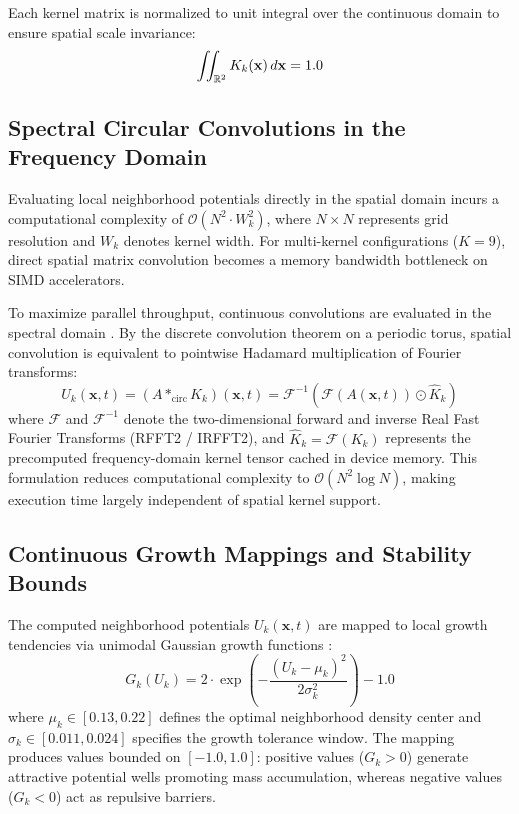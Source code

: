 Each kernel matrix is normalized to unit integral over the continuous domain to ensure spatial scale invariance:
\begin{equation}
\iint_{\mathbb{R}^2} K_k(\mathbf{x}) \, d\mathbf{x} = 1.0
\label{eq:kernel_normalization}
\end{equation}

\subsection{Spectral Circular Convolutions in the Frequency Domain}
\label{subsec:model_spectral_convolutions}

Evaluating local neighborhood potentials directly in the spatial domain incurs a computational complexity of $\mathcal{O}(N^2 \cdot W_k^2)$, where $N \times N$ represents grid resolution and $W_k$ denotes kernel width. For multi-kernel configurations ($K = 9$), direct spatial matrix convolution becomes a memory bandwidth bottleneck on SIMD accelerators.

To maximize parallel throughput, continuous convolutions are evaluated in the spectral domain \parencite{chan2023towards}. By the discrete convolution theorem on a periodic torus, spatial convolution is equivalent to pointwise Hadamard multiplication of Fourier transforms:
\begin{equation}
U_k(\mathbf{x}, t) = (A *_{\text{circ}} K_k)(\mathbf{x}, t) = \mathcal{F}^{-1}\left( \mathcal{F}(A(\mathbf{x}, t)) \odot \widehat{K}_k \right)
\label{eq:fourier_convolution}
\end{equation}
where $\mathcal{F}$ and $\mathcal{F}^{-1}$ denote the two-dimensional forward and inverse Real Fast Fourier Transforms (RFFT2 / IRFFT2), and $\widehat{K}_k = \mathcal{F}(K_k)$ represents the precomputed frequency-domain kernel tensor cached in device memory. This formulation reduces computational complexity to $\mathcal{O}(N^2 \log N)$, making execution time largely independent of spatial kernel support.

\subsection{Continuous Growth Mappings and Stability Bounds}
\label{subsec:model_growth_mappings}

The computed neighborhood potentials $U_k(\mathbf{x}, t)$ are mapped to local growth tendencies via unimodal Gaussian growth functions \parencite{chan2019lenia, plantec2025flowlenia}:
\begin{equation}
G_k(U_k) = 2 \cdot \exp\left( -\frac{(U_k - \mu_k)^2}{2\sigma_k^2} \right) - 1.0
\label{eq:gaussian_growth_mapping}
\end{equation}
where $\mu_k \in [0.13, 0.22]$ defines the optimal neighborhood density center and $\sigma_k \in [0.011, 0.024]$ specifies the growth tolerance window. The mapping produces values bounded on $[-1.0, 1.0]$: positive values ($G_k > 0$) generate attractive potential wells promoting mass accumulation, whereas negative values ($G_k < 0$) act as repulsive barriers.


